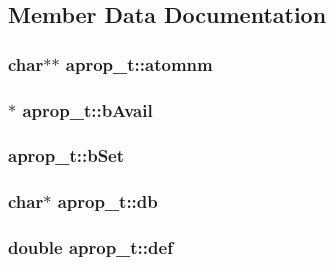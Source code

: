 \subsection{\-Member \-Data \-Documentation}
\hypertarget{structaprop__t_a50d86df216b28dcd14389a575a2ee920}{
\subsubsection[{atomnm}]{\setlength{\rightskip}{0pt plus 5cm}char$\ast$$\ast$ {\bf aprop\-\_\-t\-::atomnm}}}\label{structaprop__t_a50d86df216b28dcd14389a575a2ee920}
\hypertarget{structaprop__t_a99619b7ed2bacbaa353ea3fd01e5ae43}{
\subsubsection[{b\-Avail}]{$\ast$ {\bf aprop\-\_\-t\-::b\-Avail}}}\label{structaprop__t_a99619b7ed2bacbaa353ea3fd01e5ae43}
\hypertarget{structaprop__t_aa883b8f3d7dcd04aa5f299d911c7b0c7}{
\subsubsection[{b\-Set}]{ {\bf aprop\-\_\-t\-::b\-Set}}}\label{structaprop__t_aa883b8f3d7dcd04aa5f299d911c7b0c7}
\hypertarget{structaprop__t_a32e829d904732f22b5a29cb27f988532}{
\subsubsection[{db}]{\setlength{\rightskip}{0pt plus 5cm}char$\ast$ {\bf aprop\-\_\-t\-::db}}}\label{structaprop__t_a32e829d904732f22b5a29cb27f988532}
\hypertarget{structaprop__t_ac19822aa19051408907517986c9d8a48}{
\subsubsection[{def}]{\setlength{\rightskip}{0pt plus 5cm}double {\bf aprop\-\_\-t\-::def}}}\label{structaprop__t_ac19822aa19051408907517986c9d8a48}
